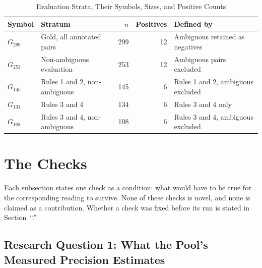 \begin{table}[H]
\caption{Evaluation Strata, Their Symbols, Sizes, and Positive Counts}
\label{tab:m-strata}
\centering
\small
\begin{tabular}{@{}l>{\tblragged}p{1.75in}rr>{\tblragged}p{2.05in}@{}}
\toprule
\textbf{Symbol} & \textbf{Stratum} & \textbf{$n$} & \textbf{Positives} & \textbf{Defined by} \\
\midrule
$G_{299}$ & Gold, all annotated pairs & 299 & 12 & Ambiguous retained as negatives \\
\addlinespace
$G_{253}$ & Non-ambiguous evaluation  & 253 & 12 & Ambiguous pairs excluded \\
\addlinespace
$G_{145}$ & Rules 1 and 2, non-ambiguous & 145 & 6 & Rules 1 and 2, ambiguous excluded \\
\addlinespace
$G_{134}$ & Rules 3 and 4             & 134 & 6  & Rules 3 and 4 only \\
\addlinespace
$G_{108}$ & Rules 3 and 4, non-ambiguous & 108 & 6 & Rules 3 and 4, ambiguous excluded \\
\bottomrule
\end{tabular}
\end{table}

\section{The Checks}
\label{sec:m-controls}

Each subsection states one check as a condition: what would have to be true for the corresponding
reading to survive. None of these checks is novel, and none is claimed as a contribution. Whether a
check was fixed before its run is stated in Section~``.''

\subsection{Research Question 1: What the Pool's Measured Precision Estimates}
\label{sec:m-control-rq1}

